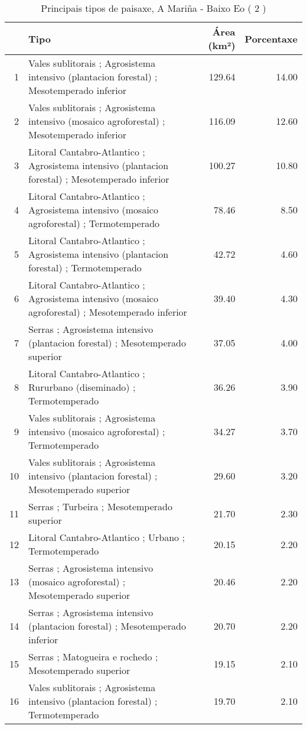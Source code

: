 \begin{table}[p]
\centering
\caption{Principais tipos de paisaxe,  A Mariña - Baixo Eo ( 2 )} 
\label{Tipos 2}
\begin{tabular}{rlrr}
  \hline
 & Tipo & Área (km²) & Porcentaxe \\ 
  \hline
1 & Vales sublitorais ; Agrosistema intensivo (plantacion forestal) ; Mesotemperado inferior & 129.64 & 14.00 \\ 
  2 & Vales sublitorais ; Agrosistema intensivo (mosaico agroforestal) ; Mesotemperado inferior & 116.09 & 12.60 \\ 
  3 & Litoral Cantabro-Atlantico ; Agrosistema intensivo (plantacion forestal) ; Mesotemperado inferior & 100.27 & 10.80 \\ 
  4 & Litoral Cantabro-Atlantico ; Agrosistema intensivo (mosaico agroforestal) ; Termotemperado & 78.46 & 8.50 \\ 
  5 & Litoral Cantabro-Atlantico ; Agrosistema intensivo (plantacion forestal) ; Termotemperado & 42.72 & 4.60 \\ 
  6 & Litoral Cantabro-Atlantico ; Agrosistema intensivo (mosaico agroforestal) ; Mesotemperado inferior & 39.40 & 4.30 \\ 
  7 & Serras ; Agrosistema intensivo (plantacion forestal) ; Mesotemperado superior & 37.05 & 4.00 \\ 
  8 & Litoral Cantabro-Atlantico ; Rururbano (diseminado) ; Termotemperado & 36.26 & 3.90 \\ 
  9 & Vales sublitorais ; Agrosistema intensivo (mosaico agroforestal) ; Termotemperado & 34.27 & 3.70 \\ 
  10 & Vales sublitorais ; Agrosistema intensivo (plantacion forestal) ; Mesotemperado superior & 29.60 & 3.20 \\ 
  11 & Serras ; Turbeira ; Mesotemperado superior & 21.70 & 2.30 \\ 
  12 & Litoral Cantabro-Atlantico ; Urbano ; Termotemperado & 20.15 & 2.20 \\ 
  13 & Serras ; Agrosistema intensivo (mosaico agroforestal) ; Mesotemperado superior & 20.46 & 2.20 \\ 
  14 & Serras ; Agrosistema intensivo (plantacion forestal) ; Mesotemperado inferior & 20.70 & 2.20 \\ 
  15 & Serras ; Matogueira e rochedo ; Mesotemperado superior & 19.15 & 2.10 \\ 
  16 & Vales sublitorais ; Agrosistema intensivo (plantacion forestal) ; Termotemperado & 19.70 & 2.10 \\ 

\end{tabular}
\end{table}
